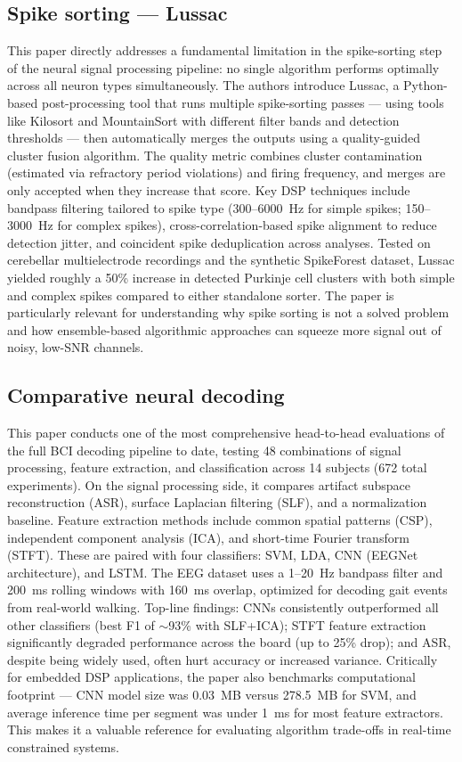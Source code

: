 \documentclass[11pt]{article}
\begin{document}
\subsection*{Spike sorting --- Lussac \cite{llobet2022lussac}}
This paper directly addresses a fundamental limitation in the spike-sorting step
of the neural signal processing pipeline: no single algorithm performs optimally
across all neuron types simultaneously. The authors introduce Lussac, a
Python-based post-processing tool that runs multiple spike-sorting passes ---
using tools like Kilosort and MountainSort with different filter bands and
detection thresholds --- then automatically merges the outputs using a
quality-guided cluster fusion algorithm. The quality metric combines cluster
contamination (estimated via refractory period violations) and firing frequency,
and merges are only accepted when they increase that score. Key DSP techniques
include bandpass filtering tailored to spike type (300--6000~Hz for simple spikes;
150--3000~Hz for complex spikes), cross-correlation-based spike alignment to
reduce detection jitter, and coincident spike deduplication across analyses.
Tested on cerebellar multielectrode recordings and the synthetic SpikeForest
dataset, Lussac yielded roughly a 50\% increase in detected Purkinje cell
clusters with both simple and complex spikes compared to either standalone
sorter. The paper is particularly relevant for understanding why spike sorting
is not a solved problem and how ensemble-based algorithmic approaches can
squeeze more signal out of noisy, low-SNR channels.

\subsection*{Comparative neural decoding \cite{shevchenko2024decoding}}
This paper conducts one of the most comprehensive head-to-head evaluations
of the full BCI decoding pipeline to date, testing 48 combinations of signal
processing, feature extraction, and classification across 14 subjects (672
total experiments). On the signal processing side, it compares artifact subspace
reconstruction (ASR), surface Laplacian filtering (SLF), and a normalization
baseline. Feature extraction methods include common spatial patterns (CSP),
independent component analysis (ICA), and short-time Fourier transform (STFT).
These are paired with four classifiers: SVM, LDA, CNN (EEGNet architecture), and
LSTM. The EEG dataset uses a 1--20~Hz bandpass filter and 200~ms rolling windows
with 160~ms overlap, optimized for decoding gait events from real-world walking.
Top-line findings: CNNs consistently outperformed all other classifiers (best F1
of $\sim$93\% with SLF+ICA); STFT feature extraction significantly degraded
performance across the board (up to 25\% drop); and ASR, despite being widely
used, often hurt accuracy or increased variance. Critically for embedded DSP
applications, the paper also benchmarks computational footprint --- CNN model size
was 0.03~MB versus 278.5~MB for SVM, and average inference time per segment was
under 1~ms for most feature extractors. This makes it a valuable reference for
evaluating algorithm trade-offs in real-time constrained systems.
\end{document}
